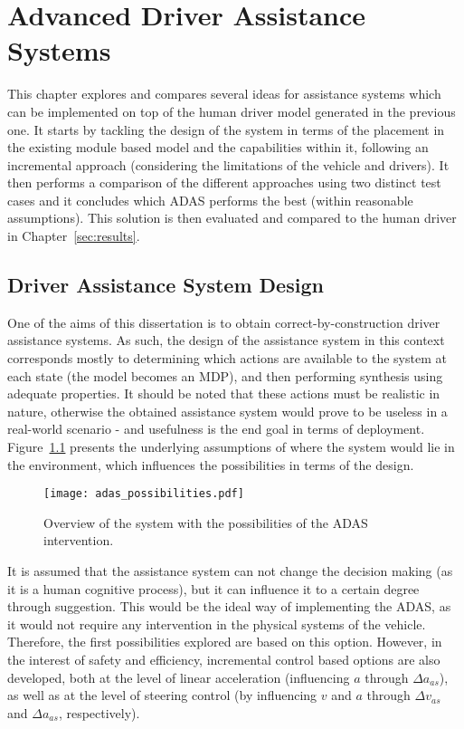 \chapter{Advanced Driver Assistance Systems}

This chapter explores and compares several ideas for assistance systems which can be implemented on top of the human driver model generated in the previous one. It starts by tackling the design of the system in terms of the placement in the existing module based model and the capabilities within it, following an incremental approach (considering the limitations of the vehicle and drivers). It then performs a comparison of the different approaches using two distinct test cases and it concludes which ADAS performs the best (within reasonable assumptions). This solution is then evaluated and compared to the human driver in Chapter~\ref{sec:results}.

\section{Driver Assistance System Design}

One of the aims of this dissertation is to obtain correct-by-construction driver assistance systems. As such, the design of the assistance system in this context corresponds mostly to determining which actions are available to the system at each state (the model becomes an MDP), and then performing synthesis using adequate properties. It should be noted that these actions must be realistic in nature, otherwise the obtained assistance system would prove to be useless in a real-world scenario - and usefulness is the end goal in terms of deployment. Figure~\ref{fig:adas_possibilities} presents the underlying assumptions of where the system would lie in the environment, which influences the possibilities in terms of the design.

\vspace{1em}
\begin{figure}[h]
    \centering
    \texttt{[image: adas\_possibilities.pdf]}
    \caption{Overview of the system with the possibilities of the ADAS intervention.}
    \label{fig:adas_possibilities}
\end{figure}

It is assumed that the assistance system can not change the decision making (as it is a human cognitive process), but it can influence it to a certain degree through suggestion. This would be the ideal way of implementing the ADAS, as it would not require any intervention in the physical systems of the vehicle. Therefore, the first possibilities explored are based on this option. However, in the interest of safety and efficiency, incremental control based options are also developed, both at the level of linear acceleration (influencing $a$ through $\Delta a_{as}$), as well as at the level of steering control (by influencing $v$ and $a$ through $\Delta v_{as}$ and $\Delta a_{as}$, respectively). 

